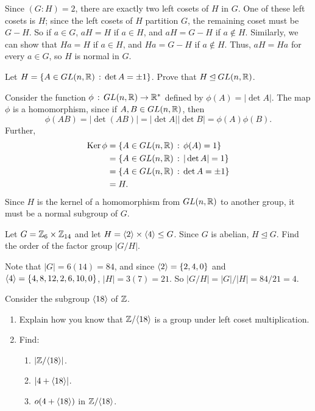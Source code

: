 \begin{solution}[print=false]
Since $(G:H)=2$, there are exactly two left
    cosets of $H$ in $G$.  One of these left cosets is
    $H$; since the left cosets of $H$ partition $G$,
    the remaining coset must be $G-H$.  So if $a\in G$,
    $aH=H$ if $a\in H$, and $aH=G-H$ if $a\notin H$.
    Similarly, we can show that $Ha=H$ if $a\in H$, and
    $Ha=G-H$ if $a\notin H$. Thus, $aH=Ha$ for every
    $a\in G$, so $H$ is normal in $G$.
\end{solution}

\begin{exercise}
Let $H=\{A\in GL(n,\mathbb{R})\,:\,\det A=\pm 1\}$.  Prove that $H\unlhd GL(n,\mathbb{R})$.

\end{exercise}

\begin{solution}[print=false]
Consider the function $\phi \,:\,GL(n, \mathbb{R})\to \mathbb{R}^*$ defined by
$\phi(A)=|\det A|$. The map $\phi$ is a
homomorphism, since if $A,B\in GL(n,\mathbb{R})$, then
$$\phi(AB)=|\det(AB)|=|\det A||\det B|=\phi(A)\phi(B).$$  Further,
\begin{align*}\operatorname{Ker} \phi&=\{A\in GL(n,\mathbb{R})\,:\,
\phi(A)=1\}\\&=\{A\in GL(n,\mathbb{R})\,:\, |\det A|=1\}\\&=\{A\in
GL(n,\mathbb{R})\,:\, \det A=\pm 1\}\\&=H.\end{align*} Since $H$ is
the kernel of a homomorphism from $GL(n,\mathbb{R})$ to another group, it must be a
normal subgroup of $G$.
\end{solution}



\begin{exercise} Let $G=\mathbb{Z}_6\times \mathbb{Z}_{14}$ and let $H=\langle2\rangle\times \langle4\rangle\leq G$.  Since $G$ is abelian, $H\unlhd G$.  Find the order of the factor group $|G/H|$.
\end{exercise}

\begin{solution}[print=false]
Note that $|G|=6(14)=84$, and since $\langle2\rangle=\{2,4,0\}$ and $\langle4\rangle=\{4,8,12,2,6,10,0\}$, $|H|=3(7)=21$. So $|G/H|=|G|/|H|=84/21=4$.
\end{solution}



\begin{exercise}
Consider the subgroup $\langle18\rangle$ of $\mathbb{Z}$.

\begin{enumerate}
\item Explain how you know that $\mathbb{Z}/\langle18\rangle$ is a group under left coset multiplication.
\item Find:

\begin{enumerate}
\item $|\mathbb{Z}/\langle18\rangle|$.
\item $|4+\langle18\rangle|$.
\item $o(4+\langle18\rangle)$ in $\mathbb{Z}/\langle18\rangle$.
\end{enumerate}
\end{enumerate}

\end{exercise}


